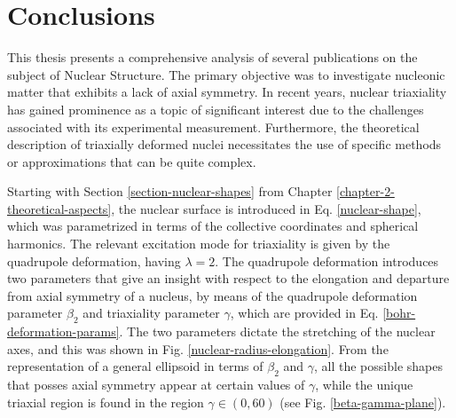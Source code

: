 \chapter{Conclusions}
\label{chapter-8-conclusions}

This thesis presents a comprehensive analysis of several publications on the subject of Nuclear Structure. The primary objective was to investigate nucleonic matter that exhibits a lack of axial symmetry. In recent years, nuclear triaxiality has gained prominence as a topic of significant interest due to the challenges associated with its experimental measurement. Furthermore, the theoretical description of triaxially deformed nuclei necessitates the use of specific methods or approximations that can be quite complex.


Starting with Section \ref{section-nuclear-shapes} from Chapter \ref{chapter-2-theoretical-aspects}, the nuclear surface is introduced in Eq. \ref{nuclear-shape}, which was parametrized in terms of the collective coordinates and spherical harmonics. The relevant excitation mode for triaxiality is given by the quadrupole deformation, having $\lambda=2$. The quadrupole deformation introduces two parameters that give an insight with respect to the elongation and departure from axial symmetry of a nucleus, by means of the quadrupole deformation parameter $\beta_2$ and triaxiality parameter $\gamma$, which are provided in Eq. \ref{bohr-deformation-params}. The two parameters dictate the stretching of the nuclear axes, and this was shown in Fig. \ref{nuclear-radius-elongation}. From the representation of a general ellipsoid in terms of $\beta_2$ and $\gamma$, all the possible shapes that posses axial symmetry appear at certain values of $\gamma$, while the unique triaxial region is found in the region $\gamma\in(0,60)$ (see Fig. \ref{beta-gamma-plane}).

